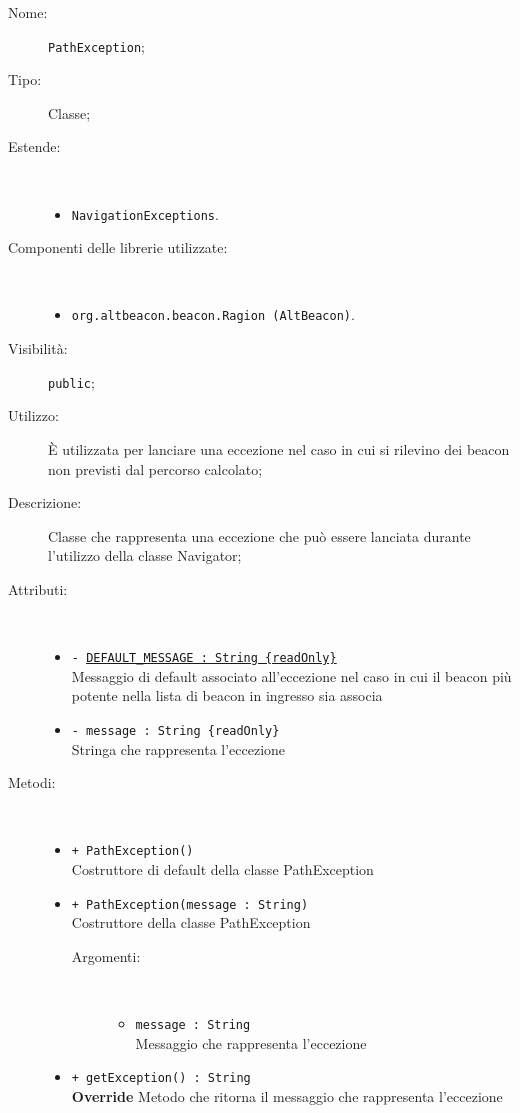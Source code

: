\documentclass[../DefinizioneDiProdotto.tex]{subfiles}
\begin{document}
\begin{description}
	\item[Nome:] \texttt{PathException};
	\item[Tipo:] Classe;
	\item[Estende:] \
	\begin{itemize}
		\item \texttt{NavigationExceptions}.
	\end{itemize}
	\item[Componenti delle librerie utilizzate:] \
	\begin{itemize}
		\item \texttt{org.altbeacon.beacon.Ragion (AltBeacon)}.
		
	\end{itemize}
	\item[Visibilità:] \texttt{public};
	\item[Utilizzo:] È utilizzata per lanciare una eccezione nel caso in cui si rilevino dei beacon non previsti dal percorso calcolato;
	\item[Descrizione:] Classe che rappresenta una eccezione che può essere lanciata durante l'utilizzo della classe Navigator;
	\item[Attributi:] \
	\begin{itemize}
		\item \texttt{- \underline{DEFAULT\_MESSAGE : String \{readOnly\}}}\\
		Messaggio di default associato all'eccezione nel caso in cui il beacon più potente nella lista di beacon in ingresso sia associa
		
		\item \texttt{- message : String \{readOnly\}}\\
		Stringa che rappresenta l'eccezione
		
	\end{itemize}
	\item[Metodi:] \
	\begin{itemize}
		\item \texttt{+ PathException()}\\
		Costruttore di default della classe PathException
		\item \texttt{+ PathException(message : String)}\\
		Costruttore della classe PathException
		\begin{description}
			\item[Argomenti:] \
			\begin{itemize}
				\item \texttt{message : String}\\
				Messaggio che rappresenta l'eccezione\end{itemize}
		\end{description}
		\item \texttt{+ getException() : String}\\
		\textbf{Override} Metodo che ritorna il messaggio che rappresenta l'eccezione
	\end{itemize}
\end{description}
\end{document}
